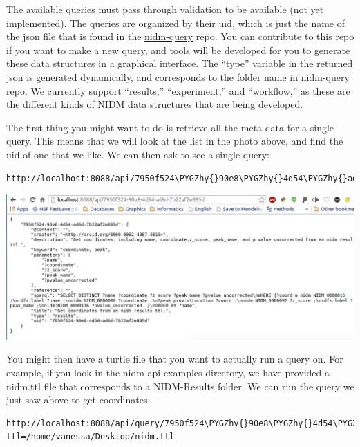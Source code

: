 \documentclass[letterpaper,10pt,english]{sphinxmanual}
\def\PYGZhy{\char`\-}
\begin{document}
The available queries must pass through validation to be available (not yet implemented). The queries are organized by their uid, which is just the name of the json file that is found in the \href{https://github.com/incf-nidash/nidm-query}{nidm-query} repo. You can contribute to this repo if you want to make a new query, and tools will be developed for you to generate these data structures in a graphical interface. The ``type'' variable in the returned json is generated dynamically, and corresponds to the folder name in \href{https://github.com/incf-nidash/nidm-query}{nidm-query} repo. We currently support ``results,'' ``experiment,'' and ``workflow,'' as these are the different kinds of NIDM data structures that are being developed.

The first thing you might want to do is retrieve all the meta data for a single query. This means that we will look at the list in the photo above, and find the uid of one that we like. We can then ask to see a single query:

\begin{Verbatim}[commandchars=\\\{\}]
http://localhost:8088/api/7950f524\PYGZhy{}90e8\PYGZhy{}4d54\PYGZhy{}ad6d\PYGZhy{}7b22af2e895d
\end{Verbatim}

\includegraphics{singleQuery.png}

You might then have a turtle file that you want to actually run a query on. For example, if you look in the nidm-api examples directory, we have provided a nidm.ttl file that corresponds to a NIDM-Results folder. We can run the query we just saw above to get coordinates:

\begin{Verbatim}[commandchars=\\\{\}]
http://localhost:8088/api/query/7950f524\PYGZhy{}90e8\PYGZhy{}4d54\PYGZhy{}ad6d\PYGZhy{}7b22af2e895d?ttl=/home/vanessa/Desktop/nidm.ttl
\end{Verbatim}
\end{document}
